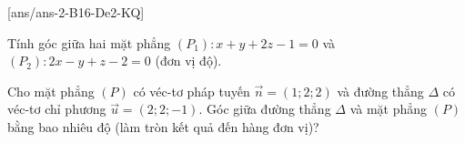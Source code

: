 [ans/ans-2-B16-De2-KQ]
\caukq
\begin{ex}%
	Tính góc giữa hai mặt phẳng $(P_1)\colon x+y+2z-1=0$ và $(P_2)\colon 2x-y+z-2=0$ (đơn vị độ).
\end{ex}
\begin{ex}%
	Cho mặt phẳng $(P)$ có véc-tơ pháp tuyến $\overrightarrow{n}=(1 ; 2 ; 2)$ và đường thẳng $\Delta$ có véc-tơ chỉ phương $\overrightarrow{u}=(2 ; 2 ;-1)$. Góc giữa đường thẳng $\Delta$ và mặt phẳng $(P)$ bằng bao nhiêu độ (làm tròn kết quả đến hàng đơn vị)?
\end{ex}
